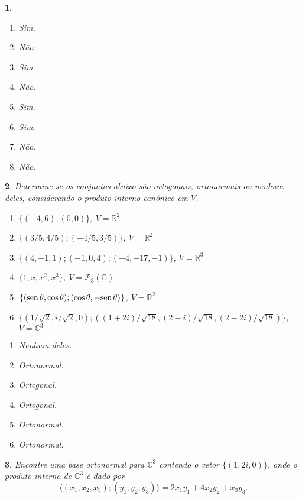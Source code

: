 \documentclass[12pt]{exam}
\newtheorem{exercicio}{}
\newcommand{\real}{\mathbb{R}}
\newcommand{\complex}{\mathbb{C}}
\renewcommand{\sin}{{\rm sen\,}}
\begin{document}
\begin{exercicio}
\begin{enumerate}[label=({\alph*})]
  \end{enumerate}
  \begin{solucao}
  \begin{enumerate}[label=({\alph*})]
    \item Sim.
    \item N\~ao.
    \item Sim.
    \item N\~ao.
    \item Sim.
    \item Sim.
    \item N\~ao.
    \item N\~ao.
  \end{enumerate}
  \end{solucao}
\end{exercicio}

\begin{exercicio}
  Determine se os conjuntos abaixo s\~ao ortogonais, ortonormais ou nenhum deles, considerando o produto interno can\^onico em $V$.
  \begin{enumerate}[label=({\alph*})]
    \item $\{(-4, 6); (5, 0)\}$, $V = \real^2$
    \item $\{(3/5, 4/5); (-4/5, 3/5)\}$, $V = \real^2$
    \item $\{(4, -1, 1); (-1, 0, 4); (-4, -17, -1)\}$, $V = \real^3$
    \item $\{1, x, x^2, x^3\}$, $V = \mathcal{P}_3(\complex)$
    \item $\{(\sin \theta, \cos \theta); (\cos \theta, -\sin \theta)\}$, $V = \real^2$
    \item $\{(1/\sqrt{2}, i/\sqrt{2}, 0); ((1 + 2i)/\sqrt{18}, (2 - i)/\sqrt{18}, (2 - 2i)/\sqrt{18})\}$, $V = \complex^3$
  \end{enumerate}
  \begin{solucao}
    \begin{enumerate}[label=({\alph*})]
      \item Nenhum deles.
      \item Ortonormal.
      \item Ortogonal.
      \item Ortogonal.
      \item Ortonormal.
      \item Ortonormal.
    \end{enumerate}
  \end{solucao}
\end{exercicio}

\begin{exercicio}
  Encontre uma base ortonormal para $\complex^3$ contendo o vetor $\{(1, 2i, 0)\}$, onde o produto interno de $\complex^3$ \'e dado por
  \[
      \langle (x_1, x_2, x_3) ; (y_1, y_2, y_3) \rangle = 2x_1\overline{y_1} + 4x_2\overline{y_2} + x_3\overline{y_3}.
  \]
\end{exercicio}
\end{document}
